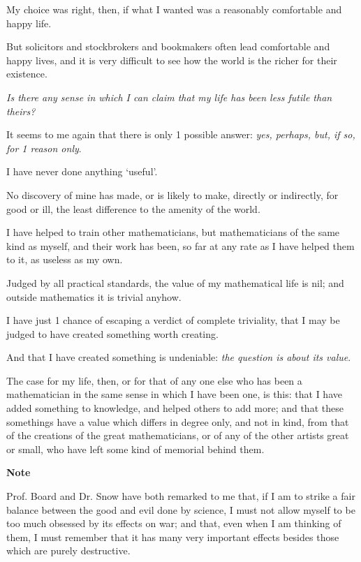 \documentclass{article}
\numberwithin{equation}{section}
\begin{document}
%
My choice was right, then, if what I wanted was a reasonably comfortable and happy life.

But solicitors and stockbrokers and bookmakers often lead comfortable and happy lives, and it is very difficult to see how the world is the richer for their existence.

\textit{Is there any sense in which I can claim that my life has been less futile than theirs?}

It seems to me again that there is only 1 possible answer: \textit{yes, perhaps, but, if so, for 1 reason only}.

%
I have never done anything `useful'.

No discovery of mine has made, or is likely to make, directly or indirectly, for good or ill, the least difference to the amenity of the world.

I have helped to train other mathematicians, but mathematicians of the same kind as myself, and their work has been, so far at any rate as I have helped them to it, as useless as my own.

Judged by all practical standards, the value of my mathematical life is nil; and outside mathematics it is trivial anyhow.

I have just 1 chance of escaping a verdict of complete triviality, that I may be judged to have created something worth creating.

And that I have created something is undeniable: \textit{the question is about its value}.

%
The case for my life, then, or for that of any one else who has been a mathematician in the same sense in which I have been one, is this: that I have added something to knowledge, and helped others to add more; and that these somethings have a value which differs in degree only, and not in kind, from that of the creations of the great mathematicians, or of any of the other artists great or small, who have left some kind of memorial behind them.

\begin{center}
    \large\textbf{Note}
\end{center}
Prof. Board and Dr. Snow have both remarked to me that, if I am to strike a fair balance between the good and evil done by science, I must not allow myself to be too much obsessed by its effects on war; and that, even when I am thinking of them, I must remember that it has many very important effects besides those which are purely destructive.
\end{document}
